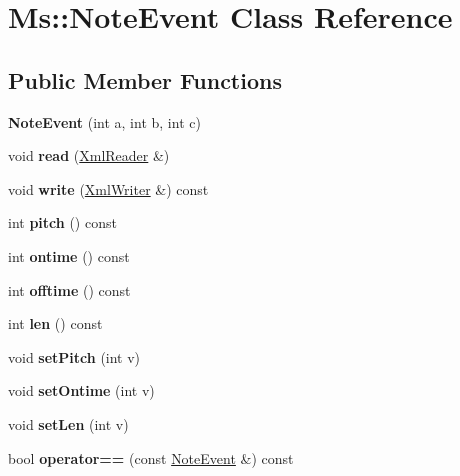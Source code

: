 \hypertarget{class_ms_1_1_note_event}{}\section{Ms\+:\+:Note\+Event Class Reference}
\label{class_ms_1_1_note_event}
\subsection*{Public Member Functions}
\begin{DoxyCompactItemize}
\item 
\mbox{\label{class_ms_1_1_note_event_a5628a69babd498f07edd2b501336a13e}} 
{\bfseries Note\+Event} (int a, int b, int c)
\item 
\mbox{\label{class_ms_1_1_note_event_ab4d57dfa85fbcab01801b569100f51fe}} 
void {\bfseries read} (\hyperlink{class_ms_1_1_xml_reader}{Xml\+Reader} \&)
\item 
\mbox{\label{class_ms_1_1_note_event_ab795bf335026e7e08b961c2cc81a367e}} 
void {\bfseries write} (\hyperlink{class_ms_1_1_xml_writer}{Xml\+Writer} \&) const
\item 
\mbox{\label{class_ms_1_1_note_event_a63ccc6274bcc77476dd67df7749e1645}} 
int {\bfseries pitch} () const
\item 
\mbox{\label{class_ms_1_1_note_event_a3ec401c1a8c929aa34228a9a397fa47d}} 
int {\bfseries ontime} () const
\item 
\mbox{\label{class_ms_1_1_note_event_aaebd87f3f41f98e068a6178977c075dc}} 
int {\bfseries offtime} () const
\item 
\mbox{\label{class_ms_1_1_note_event_a1414750ed617cfe6ba8f7f82c85d4b06}} 
int {\bfseries len} () const
\item 
\mbox{\label{class_ms_1_1_note_event_a2ec3c3264ca7b440fb228c9bc0c0cfca}} 
void {\bfseries set\+Pitch} (int v)
\item 
\mbox{\label{class_ms_1_1_note_event_ac2d1088ac1d797151d7ced833621afe1}} 
void {\bfseries set\+Ontime} (int v)
\item 
\mbox{\label{class_ms_1_1_note_event_a978652870312732550c585e3a6217b4b}} 
void {\bfseries set\+Len} (int v)
\item 
\mbox{\label{class_ms_1_1_note_event_a0726855f16ee2df90fd9618552a3fca9}} 
bool {\bfseries operator==} (const \hyperlink{class_ms_1_1_note_event}{Note\+Event} \&) const
\end{DoxyCompactItemize}



